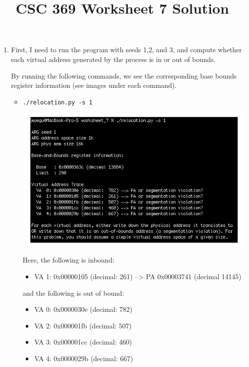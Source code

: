 \documentclass[12pt]{article}
\begin{document}
\title{CSC 369 Worksheet 7 Solution}

\maketitle

\bigskip

\begin{enumerate}[1.]
    \item

    First, I need to run the program with seeds 1,2, and 3, and compute whether
    each virtual address generated by the process is in or out of bounds.

    \bigskip

    By running the following commands, we see the corresponding base bounds register
    information (see images under each command).

    \begin{itemize}
        \item \texttt{./relocation.py -s 1}

        \begin{center}
        \includegraphics[width=0.8\linewidth]{images/worksheet_7_solution_1.png}
        \end{center}

        \bigskip

        Here, the following is inbound:

        \begin{itemize}
            \item VA  1: 0x00000105 (decimal:  261) --> PA 0x00003741 (decimal 14145)
        \end{itemize}

        \bigskip

        and the following is out of bound:

        \begin{itemize}
            \item VA  0: 0x0000030e (decimal:  782)
            \item VA  2: 0x000001fb (decimal:  507)
            \item VA  3: 0x000001cc (decimal:  460)
            \item VA  4: 0x0000029b (decimal:  667)
        \end{itemize}


\end{itemize}
\end{enumerate}
\end{document}
